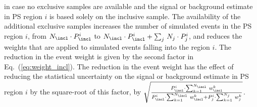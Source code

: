 in case no exclusive samples are available and the signal or background estimate in PS region $i$ is based solely on the inclusive sample.
The availability of the additional exclusive samples increases the number of simulated events in the PS region $i$, 
from $N_{\incl} \cdot P_{\incl}^{i}$ to $N_{\incl} \cdot P_{\incl}^{i} + \sum_{j} \, N_{j} \cdot P_{j}^{i}$,
and reduces the weights that are applied to simulated events falling into the region $i$.
The reduction in the event weight is given by the second factor in Eq.~(\ref{eq:weight_incl}).
The reduction in the event weight has the effect of reducing the statistical uncertainty on the signal or background estimate in PS region $i$
by the square-root of this factor,
\ie by $\sqrt{\frac{P_{\incl}^{i} \cdot \sum_{k=1}^{N_{\incl}} \, w_{\incl}^{k}}{P_{\incl}^{i} \cdot \sum_{k=1}^{N_{\incl}} \, w_{\incl}^{k} + P_{j}^{i} \cdot \sum_{k=1}^{N_{j}} \, w_{j}^{k}}}$.
